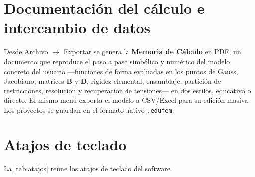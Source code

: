 \section{Documentación del cálculo e intercambio de datos}

Desde \textsf{Archivo} $\rightarrow$ \textsf{Exportar} se genera la \textbf{Memoria de Cálculo} en PDF, un documento que reproduce el paso a paso simbólico y numérico del modelo concreto del usuario ---funciones de forma evaluadas en los puntos de Gauss, Jacobiano, matrices $\bm{B}$ y $\bm{D}$, rigidez elemental, ensamblaje, partición de restricciones, resolución y recuperación de tensiones--- en dos estilos, educativo o directo. El mismo menú exporta el modelo a CSV/Excel para su edición masiva. Los proyectos se guardan en el formato nativo \texttt{.edufem}.

\section{Atajos de teclado}

La \autoref{tab:atajos} reúne los atajos de teclado del software.

